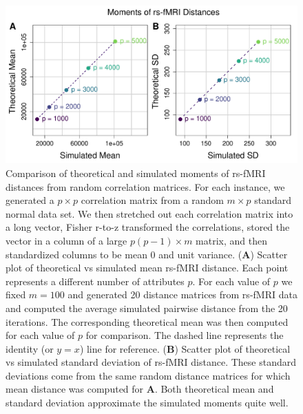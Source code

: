 \documentclass[10pt,letterpaper]{article}\usepackage[]{graphicx}\usepackage[]{color}
\begin{document}
\begin{figure}[H]
	\includegraphics[width=\textwidth]{compared_moments_rs-fMRI_standard.pdf}
	\caption{Comparison of theoretical and simulated moments of rs-fMRI distances from random correlation matrices. For each instance, we generated a $p \times p$ correlation matrix from a random $m \times p$ standard normal data set. We then stretched out each correlation matrix into a long vector, Fisher r-to-z transformed the correlations, stored the vector in a column of a large $p(p-1) \times m$ matrix, and then standardized columns to be mean 0 and unit variance. (\textbf{A}) Scatter plot of theoretical vs simulated mean rs-fMRI distance. Each point represents a different number of attributes $p$. For each value of $p$ we fixed $m=100$ and generated 20 distance matrices from rs-fMRI data and computed the average simulated pairwise distance from the 20 iterations. The corresponding theoretical mean was then computed for each value of $p$ for comparison. The dashed line represents the identity (or $y=x$) line for reference. (\textbf{B}) Scatter plot of theoretical vs simulated standard deviation of rs-fMRI distance. These standard deviations come from the same random distance matrices for which mean distance was computed for \textbf{A}. Both theoretical mean and standard deviation approximate the simulated moments quite well.}
\end{figure}
\end{document}
